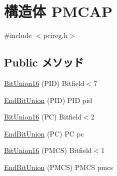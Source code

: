 \hypertarget{structPMCAP}{
\section{構造体 PMCAP}
\label{structPMCAP}
}


{\ttfamily \#include $<$pcireg.h$>$}\subsection*{Public メソッド}
\begin{DoxyCompactItemize}
\item 
\hyperlink{structPMCAP_aa1e479f4bbb94b0668585424113d9e79}{BitUnion16} (PID) Bitfield$<$7
\item 
\hyperlink{structPMCAP_a28badbba1f7c155353fa010e40de8616}{EndBitUnion} (PID) PID pid
\item 
\hyperlink{structPMCAP_adb9a568f979d58492fd21cd0d21da27d}{BitUnion16} (PC) Bitfield$<$2
\item 
\hyperlink{structPMCAP_a23d341fe3de23bec9861fe969ec80c29}{EndBitUnion} (PC) PC pc
\item 
\hyperlink{structPMCAP_afbe3a74de541f2ffa605ff001cb14c98}{BitUnion16} (PMCS) Bitfield$<$1
\item 
\hyperlink{structPMCAP_ad586025c7dc3a20be7939b9f02cf28f0}{EndBitUnion} (PMCS) PMCS pmcs
\end{DoxyCompactItemize}
